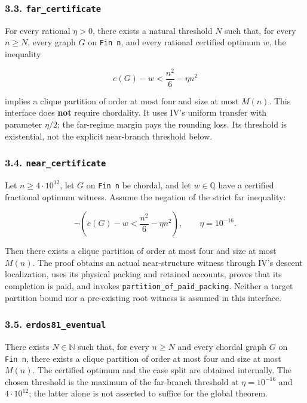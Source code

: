 \documentclass[english,11pt,a4paper]{article}
\begin{document}
\subsubsection{\texorpdfstring{3.3.
\nolinkurl{far_certificate}}{3.3. far\_certificate}}\label{far_certificate}

For every rational \(\eta>0\), there exists a natural threshold \(N\)
such that, for every \(n\ge N\), every graph \(G\) on \texttt{Fin\ n},
and every rational certified optimum \(w\), the inequality

\[
e(G)-w<\frac{n^2}{6}-\eta n^2
\]

implies a clique partition of order at most four and size at most
\(M(n)\). This interface does \textbf{not} require chordality. It uses
IV's uniform transfer with parameter \(\eta/2\); the far-regime margin
pays the rounding loss. Its threshold is existential, not the explicit
near-branch threshold below.

\subsubsection{\texorpdfstring{3.4.
\nolinkurl{near_certificate}}{3.4. near\_certificate}}\label{near_certificate}

Let \(n\ge4\cdot10^{12}\), let \(G\) on \texttt{Fin\ n} be chordal, and
let \(w\in\mathbb Q\) have a certified fractional optimum witness.
Assume the negation of the strict far inequality:

\[
\neg\left(e(G)-w<\frac{n^2}{6}-\eta n^2\right),
\qquad \eta=10^{-16}.
\]

Then there exists a clique partition of order at most four and size at
most \(M(n)\). The proof obtains an actual near-structure witness
through IV's descent localization, uses its physical packing and
retained accounts, proves that its completion is paid, and invokes
\nolinkurl{partition_of_paid_packing}. Neither a target partition bound
nor a pre-existing root witness is assumed in this interface.

\subsubsection{\texorpdfstring{3.5.
\nolinkurl{erdos81_eventual}}{3.5. erdos81\_eventual}}\label{erdos81_eventual}

There exists \(N\in\mathbb N\) such that, for every \(n\ge N\) and every
chordal graph \(G\) on \texttt{Fin\ n}, there exists a clique partition
of order at most four and size at most \(M(n)\). The certified optimum
and the case split are obtained internally. The chosen threshold is the
maximum of the far-branch threshold at \(\eta=10^{-16}\) and
\(4\cdot10^{12}\); the latter alone is not asserted to suffice for the
global theorem.
\end{document}
